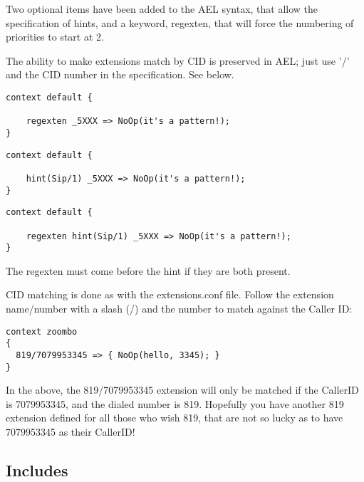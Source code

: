 {Two optional items have been added to the AEL syntax, that allow the
specification of hints, and a keyword, regexten, that will force the
numbering of priorities to start at 2.

The ability to make extensions match by CID is preserved in
AEL; just use '/' and the CID number in the specification. See below.
\begin{astlisting}
\begin{verbatim}
context default {

    regexten _5XXX => NoOp(it's a pattern!);
}
\end{verbatim}
\end{astlisting}

\begin{astlisting}
\begin{verbatim}
context default {

    hint(Sip/1) _5XXX => NoOp(it's a pattern!);
}
\end{verbatim}
\end{astlisting}

\begin{astlisting}
\begin{verbatim}
context default {

    regexten hint(Sip/1) _5XXX => NoOp(it's a pattern!);
}
\end{verbatim}
\end{astlisting}

The regexten must come before the hint if they are both present.

CID matching is done as with the extensions.conf file. Follow the extension
name/number with a slash (/) and the number to match against the Caller ID:
\begin{astlisting}
\begin{verbatim}
context zoombo
{
  819/7079953345 => { NoOp(hello, 3345); }
}
\end{verbatim}
\end{astlisting}

In the above,  the 819/7079953345 extension will only be matched if the
CallerID is 7079953345, and the dialed number is 819. Hopefully you have
another 819 extension defined for all those who wish 819, that are not so lucky
as to have 7079953345 as their CallerID!


\subsection{Includes}

}
